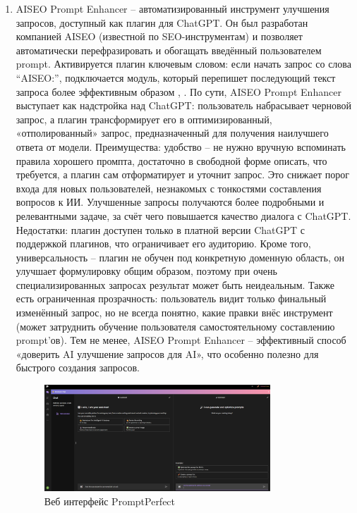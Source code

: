 \begin{enumerate}[label=\arabic*.]
\item AISEO Prompt Enhancer – автоматизированный инструмент улучшения запросов, доступный как плагин для ChatGPT. Он был разработан компанией AISEO (известной по SEO-инструментам) и позволяет автоматически перефразировать и обогащать введённый пользователем prompt. Активируется плагин ключевым словом: если начать запрос со слова “AISEO:”, подключается модуль, который перепишет последующий текст запроса более эффективным образом \cite{restack:advprompt}, \cite{whatplugin:promptenhancer}. По сути, AISEO Prompt Enhancer выступает как надстройка над ChatGPT: пользователь набрасывает черновой запрос, а плагин трансформирует его в оптимизированный, «отполированный» запрос, предназначенный для получения наилучшего ответа от модели. Преимущества: удобство – не нужно вручную вспоминать правила хорошего промпта, достаточно в свободной форме описать, что требуется, а плагин сам отформатирует и уточнит запрос. Это снижает порог входа для новых пользователей, незнакомых с тонкостями составления вопросов к ИИ\cite{whatplugin:promptenhancer}. Улучшенные запросы получаются более подробными и релевантными задаче, за счёт чего повышается качество диалога с ChatGPT. Недостатки: плагин доступен только в платной версии ChatGPT с поддержкой плагинов, что ограничивает его аудиторию. Кроме того, универсальность – плагин не обучен под конкретную доменную область, он улучшает формулировку общим образом, поэтому при очень специализированных запросах результат может быть неидеальным. Также есть ограниченная прозрачность: пользователь видит только финальный изменённый запрос, но не всегда понятно, какие правки внёс инструмент (может затруднить обучение пользователя самостоятельному составлению prompt’ов). Тем не менее, AISEO Prompt Enhancer – эффективный способ «доверить AI улучшение запросов для AI», что особенно полезно для быстрого создания запросов.
\begin{figure}[htbp]
    \centering
    \includegraphics[width=0.8\textwidth]{picture/prompt-perfect.png}
    \caption{Веб интерфейс PromptPerfect}
    \label{prompt_perfect}

\end{figure}
\end{enumerate}
